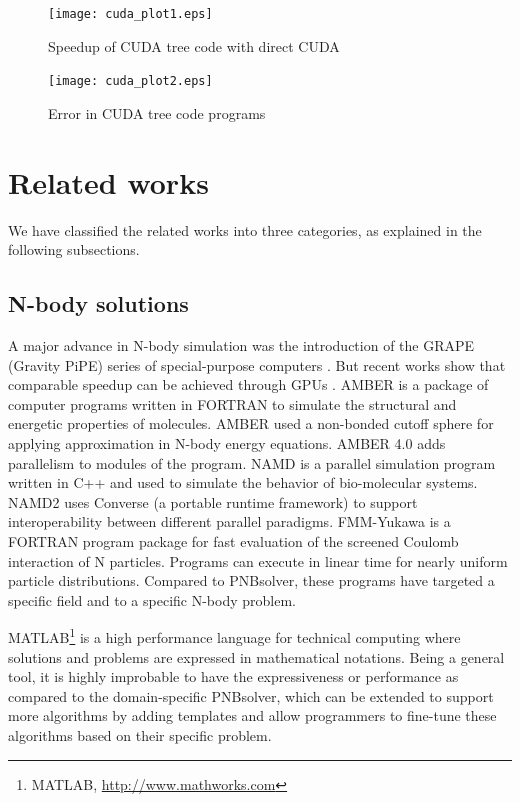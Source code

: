 \documentclass[draftclsnofoot]{elsarticle}
\begin{document}
\begin{figure}[!t]
\centering
\texttt{[image: cuda\_plot1.eps]}
\caption{Speedup of CUDA tree code with direct CUDA}
\label{fig_cuda1}
\end{figure}

\begin{figure}[!t]
\centering
\texttt{[image: cuda\_plot2.eps]}
\caption{Error in  CUDA tree code programs}
\label{fig_cuda2}
\end{figure}

\section{Related works}
\label{related}

We have classified the related works into three categories, as explained in the following subsections. 

\subsection{N-body solutions}

A  major advance in N-body simulation  was the introduction of the GRAPE (Gravity PiPE) series of special-purpose computers \cite{grape}.
But recent works show that comparable speedup can be achieved through GPUs \cite{grapegpu}. 
AMBER \cite{pearlman} is a package  of computer programs written in FORTRAN to simulate  the structural  and energetic
properties  of molecules. AMBER used a non-bonded cutoff sphere for applying approximation in  N-body energy equations. AMBER 4.0 
adds parallelism to modules of the program. NAMD \cite{kale} is a parallel simulation program written in C++ and used 
to simulate the behavior of bio-molecular systems. NAMD2 uses Converse (a portable runtime framework) to support interoperability 
between different parallel paradigms. FMM-Yukawa \cite{ jhuang} is a FORTRAN program package for fast evaluation of the screened 
Coulomb interaction of N particles. Programs can execute in linear time for nearly uniform particle distributions. Compared to 
PNBsolver, these programs have targeted a specific field and to a specific N-body problem.

MATLAB\footnote{MATLAB, \url{http://www.mathworks.com}} is a high performance language for technical computing where solutions and problems are
expressed in mathematical notations. Being a general tool, it is highly improbable to have the expressiveness or performance as compared
to the domain-specific PNBsolver, which can be extended to support more algorithms by adding templates and allow programmers to fine-tune
these algorithms based on their specific problem. 
\end{document}
